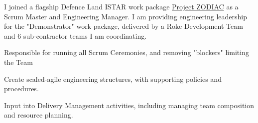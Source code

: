 {}
I joined a flagship Defence Land ISTAR work package \href{https://www.roke.co.uk/news/digitising-land-tactical-istar}{Project ZODIAC} as a Scrum Master and Engineering Manager. I am providing engineering leadership for the "Demonstrator" work package, delivered by a Roke Development Team and 6 sub-contractor teams I am coordinating.
\vspace{0.25em}
\begin{tightemize}
  \item Responsible for running all Scrum Ceremonies, and removing "blockers" limiting the Team
  \item Create scaled-agile engineering structures, with supporting policies and procedures.
  \item Input into Delivery Management activities, including managing team composition and resource planning.
\end{tightemize}
\sectionsep

